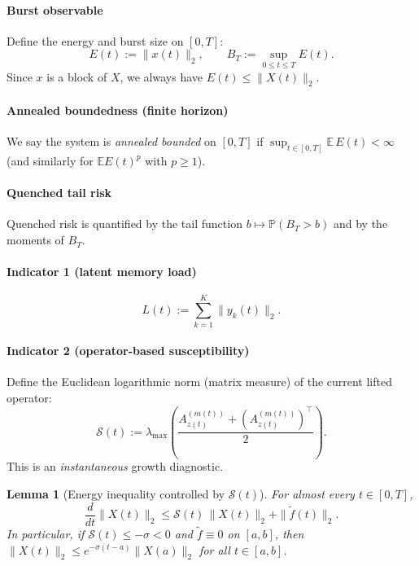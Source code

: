 \documentclass[12pt,a4paper]{article}
\newtheorem{lemma}{Lemma}
\theoremstyle{definition}
\theoremstyle{remark}
\begin{document}
\paragraph{Burst observable}
Define the energy and burst size on $[0,T]$:
\begin{equation}\label{eq:burst_obs}
	E(t):=\|x(t)\|_2,\qquad
	B_T:=\sup_{0\le t\le T}E(t).
\end{equation}
Since $x$ is a block of $X$, we always have $E(t)\le \|X(t)\|_2$.

\paragraph{Annealed boundedness (finite horizon)}
We say the system is \emph{annealed bounded} on $[0,T]$ if $\sup_{t\in[0,T]}\mathbb{E}\,E(t)<\infty$
(and similarly for $\mathbb{E}E(t)^p$ with $p\ge1$).

\paragraph{Quenched tail risk}
Quenched risk is quantified by the tail function $b\mapsto \mathbb{P}(B_T>b)$ and by the moments of $B_T$.

\paragraph{Indicator 1 (latent memory load)}
\begin{equation}\label{eq:indicator_L}
	L(t):=\sum_{k=1}^K \|y_k(t)\|_2.
\end{equation}

\paragraph{Indicator 2 (operator-based susceptibility)}
Define the Euclidean logarithmic norm (matrix measure) of the current lifted operator:
\begin{equation}\label{eq:indicator_S}
	\mathcal{S}(t)
	:=\lambda_{\max}\!\left(\frac{A_{z(t)}^{(m(t))}+(A_{z(t)}^{(m(t))})^\top}{2}\right).
\end{equation}
This is an \emph{instantaneous} growth diagnostic.

\begin{lemma}[Energy inequality controlled by $\mathcal{S}(t)$]
	\label{lem:energy_ineq}
	For almost every $t\in[0,T]$,
	\begin{equation}\label{eq:energy_ineq}
		\frac{d}{dt}\|X(t)\|_2
		\le
		\mathcal{S}(t)\,\|X(t)\|_2+\|\widetilde f(t)\|_2.
	\end{equation}
	In particular, if $\mathcal{S}(t)\le -\sigma<0$ and $\widetilde f\equiv 0$ on $[a,b]$, then
	$\|X(t)\|_2\le e^{-\sigma(t-a)}\|X(a)\|_2$ for all $t\in[a,b]$.
\end{lemma}
\end{document}
